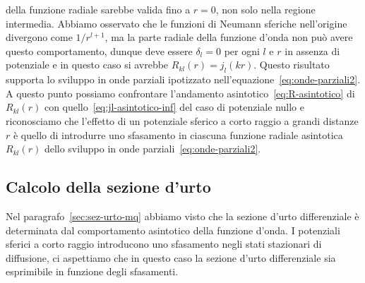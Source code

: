 \documentclass[a4paper,fleqn,twoside,12pt]{article}
\begin{document}
della funzione radiale sarebbe valida fino a $r=0$, non solo nella regione
intermedia.  Abbiamo osservato che le funzioni di Neumann sferiche nell'origine
divergono come $1/r^{l+1}$, ma la parte radiale della funzione d'onda non può
avere questo comportamento, dunque deve essere $\delta_{l} = 0$ per ogni $l$ e
$r$ in assenza di potenziale e in questo caso si avrebbe $R_{kl}(r) =
j_{l}(kr)$.
Questo risultato supporta lo sviluppo in onde parziali ipotizzato
nell'equazione~\eqref{eq:onde-parziali2}.  A questo punto possiamo confrontare
l'andamento asintotico~\eqref{eq:R-asintotico} di $R_{kl}(r)$ con
quello~\eqref{eq:jl-asintotico-inf} del caso di potenziale nullo e riconosciamo
che l'effetto di un potenziale sferico a corto raggio a grandi distanze $r$ è
quello di introdurre uno sfasamento in ciascuna funzione radiale asintotica
$R_{kl}(r)$ dello sviluppo in onde parziali~\eqref{eq:onde-parziali2}.

\subsection{Calcolo della sezione d'urto}
\label{sec:sez-urto-op}

Nel paragrafo~\ref{sec:sez-urto-mq} abbiamo visto che la sezione d'urto
differenziale è determinata dal comportamento asintotico della funzione d'onda.
I potenziali sferici a corto raggio introducono uno sfasamento negli stati
stazionari di diffusione, ci aspettiamo che in questo caso la sezione d'urto
differenziale sia esprimibile in funzione degli sfasamenti.
\end{document}
